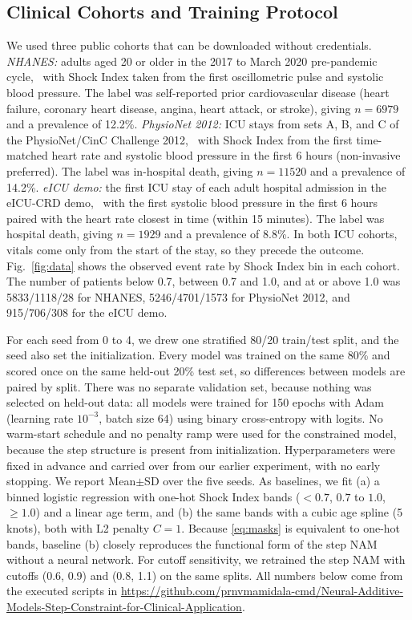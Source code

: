 \documentclass[conference]{IEEEtran}
\begin{document}
\subsection{Clinical Cohorts and Training Protocol}
We used three public cohorts that can be downloaded without credentials. \textit{NHANES:} adults aged 20 or older in the 2017 to March 2020 pre-pandemic cycle,~\cite{nhanes} with Shock Index taken from the first oscillometric pulse and systolic blood pressure. The label was self-reported prior cardiovascular disease (heart failure, coronary heart disease, angina, heart attack, or stroke), giving $n{=}6979$ and a prevalence of 12.2\%. \textit{PhysioNet 2012:} ICU stays from sets A, B, and C of the PhysioNet/CinC Challenge 2012,~\cite{silva2012,goldberger2000} with Shock Index from the first time-matched heart rate and systolic blood pressure in the first 6 hours (non-invasive preferred). The label was in-hospital death, giving $n{=}11520$ and a prevalence of 14.2\%. \textit{eICU demo:} the first ICU stay of each adult hospital admission in the eICU-CRD demo,~\cite{pollard2018} with the first systolic blood pressure in the first 6 hours paired with the heart rate closest in time (within 15 minutes). The label was hospital death, giving $n{=}1929$ and a prevalence of 8.8\%. In both ICU cohorts, vitals come only from the start of the stay, so they precede the outcome. Fig.~\ref{fig:data} shows the observed event rate by Shock Index bin in each cohort. The number of patients below 0.7, between 0.7 and 1.0, and at or above 1.0 was 5833/1118/28 for NHANES, 5246/4701/1573 for PhysioNet 2012, and 915/706/308 for the eICU demo.

For each seed from 0 to 4, we drew one stratified 80/20 train/test split, and the seed also set the initialization. Every model was trained on the same 80\% and scored once on the same held-out 20\% test set, so differences between models are paired by split. There was no separate validation set, because nothing was selected on held-out data: all models were trained for 150 epochs with Adam (learning rate $10^{-3}$, batch size 64) using binary cross-entropy with logits. No warm-start schedule and no penalty ramp were used for the constrained model, because the step structure is present from initialization. Hyperparameters were fixed in advance and carried over from our earlier experiment, with no early stopping. We report Mean$\pm$SD over the five seeds. As baselines, we fit (a) a binned logistic regression with one-hot Shock Index bands ($<0.7$, $0.7$ to $1.0$, $\ge1.0$) and a linear age term, and (b) the same bands with a cubic age spline (5 knots), both with L2 penalty $C{=}1$. Because \eqref{eq:masks} is equivalent to one-hot bands, baseline (b) closely reproduces the functional form of the step NAM without a neural network. For cutoff sensitivity, we retrained the step NAM with cutoffs (0.6, 0.9) and (0.8, 1.1) on the same splits. All numbers below come from the executed scripts in \url{https://github.com/prnvmamidala-cmd/Neural-Additive-Models-Step-Constraint-for-Clinical-Application}.
\end{document}
